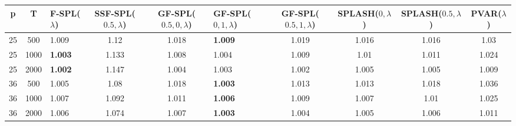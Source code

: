 \begin{tabular}{cclcclcccc}
\hline
  p  &  T   & F-SPL($\lambda$)   &  SSF-SPL($0.5, \lambda$)  &  GF-SPL($0.5, 0, \lambda$)  & GF-SPL($0, 1, \lambda$)   &  GF-SPL($0.5, 1, \lambda$)  &  SPLASH($0, \lambda$)  &  SPLASH($0.5, \lambda$)  &  PVAR($\lambda$)  \\
\hline
 25  & 500  & 1.009              &           1.12            &            1.018            & \textbf{1.009}            &            1.019            &         1.016          &          1.016           &       1.03        \\
 25  & 1000 & \textbf{1.003}     &           1.133           &            1.008            & 1.004                     &            1.009            &          1.01          &          1.011           &       1.024       \\
 25  & 2000 & \textbf{1.002}     &           1.147           &            1.004            & 1.003                     &            1.002            &         1.005          &          1.005           &       1.009       \\
 36  & 500  & 1.005              &           1.08            &            1.018            & \textbf{1.003}            &            1.013            &         1.013          &          1.018           &       1.036       \\
 36  & 1000 & 1.007              &           1.092           &            1.011            & \textbf{1.006}            &            1.009            &         1.007          &           1.01           &       1.025       \\
 36  & 2000 & 1.006              &           1.074           &            1.007            & \textbf{1.003}            &            1.004            &         1.005          &          1.006           &       1.011       \\
\hline
\end{tabular}